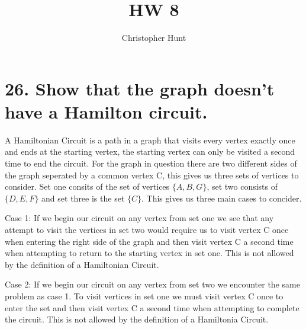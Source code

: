 \documentclass{article}
\title{HW 8}
\author{Christopher Hunt}
\date{}
\begin{document}
\pagestyle{fancy}
\fancyhf{}
\rhead{\thepage}
\maketitle

\section*{26. Show that the graph doesn't have a Hamilton circuit.}
\begin{center}
\end{center}

A Hamiltonian Circuit is a path in a graph that visits every vertex exactly once and ends at the starting vertex, the starting vertex can only be visited a second time to end the circuit. For the graph in question there are two different sides of the graph seperated by a common vertex C, this gives us three sets of vertices to consider. Set one consits of the set of vertices $\{A,B,G\}$, set two consists of $\{D,E,F\}$ and set three is the set $\{C\}$. This gives us three main cases to concider.

Case 1: If we begin our circuit on any vertex from set one we see that any attempt to visit the vertices in set two would require us to visit vertex C once when entering the right side of the graph and then visit vertex C a second time when attempting to return to the starting vertex in set one. This is not allowed by the definition of a Hamiltonian Circuit.

Case 2: If we begin our circuit on any vertex from set two we encounter the same problem as case 1. To visit vertices in set one we must visit vertex C once to enter the set and then visit vertex C a second time when attempting to complete the circuit. This is not allowed by the definition of a Hamiltonia Circuit.
\end{document}
